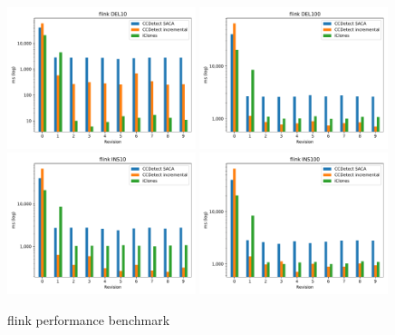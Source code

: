 \begin{figure}[H]
    \begin{center}
        \includegraphics[width=0.49\textwidth]{figures/performancegraphs/flink_DEL10.pdf}
        \includegraphics[width=0.49\textwidth]{figures/performancegraphs/flink_DEL100.pdf}
        \includegraphics[width=0.49\textwidth]{figures/performancegraphs/flink_INS10.pdf}
        \includegraphics[width=0.49\textwidth]{figures/performancegraphs/flink_INS100.pdf}
    \end{center}
    \caption{flink performance benchmark}
    \label{fig:flink}
\end{figure}

